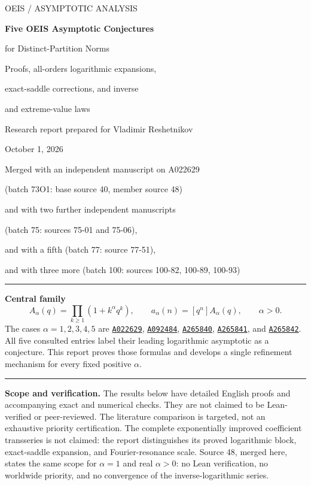 \documentclass[11pt]{article}
\numberwithin{equation}{section}
\theoremstyle{definition}\newtheorem{definition}[theorem]{Definition}
\theoremstyle{remark}\newtheorem{remark}[theorem]{Remark}
\newcommand{\coef}[2]{[#1^{#2}]}
\newcommand{\OEIS}[1]{\href{https://oeis.org/#1}{\texttt{#1}}}
\begin{document}
\hypersetup{pageanchor=false}
\begin{titlepage}
\thispagestyle{empty}
\vspace*{12mm}
{\large\sffamily OEIS \; / \; ASYMPTOTIC ANALYSIS}\par
\vspace{11mm}
{\huge\bfseries Five OEIS Asymptotic Conjectures\par for Distinct-Partition Norms\par}
\vspace{7mm}
{\Large Proofs, all-orders logarithmic expansions,\par exact-saddle corrections, and inverse\par and extreme-value laws\par}
\vspace{13mm}
{\large Research report prepared for Vladimir Reshetnikov\par}
{\large October 1, 2026\par}
\vspace{3mm}
{\normalsize Merged with an independent manuscript on A022629\par
(batch 73O1: base source 40, member source 48)\par
and with two further independent manuscripts\par
(batch 75: sources 75-01 and 75-06),\par
and with a fifth (batch 77: source 77-51),\par
and with three more (batch 100: sources 100-82, 100-89, 100-93)\par}
\vspace{12mm}
\hrule\vspace{6mm}
\noindent\textbf{Central family}
\[
 A_\alpha(q)=\prod_{k\ge1}(1+k^\alpha q^k),\qquad
 a_\alpha(n)=\coef{q}{n}A_\alpha(q),\qquad \alpha>0.
\]
\noindent The cases $\alpha=1,2,3,4,5$ are \OEIS{A022629},
\OEIS{A092484}, \OEIS{A265840}, \OEIS{A265841}, and \OEIS{A265842}.
All five consulted entries label their leading logarithmic asymptotic as a
conjecture. This report proves those formulas and develops a single refinement
mechanism for every fixed positive $\alpha$.
\vspace{6mm}\hrule
\vfill
\noindent\textbf{Scope and verification.} The results below have detailed English
proofs and accompanying exact and numerical checks. They are not claimed to be
Lean-verified or peer-reviewed. The literature comparison is targeted, not an
exhaustive priority certification. The complete exponentially improved
coefficient transseries is not claimed: the report distinguishes its proved
logarithmic block, exact-saddle expansion, and Fourier-resonance scale.
Source 48, merged here, states the same scope for $\alpha=1$ and real
$\alpha>0$: no Lean verification, no worldwide priority, and no convergence of
the inverse-logarithmic series.
\end{titlepage}
\hypersetup{pageanchor=true}
\end{document}

